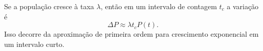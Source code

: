 Se a população cresce à taxa $\lambda$, então em um intervalo de contagem $t_c$ a variação é
\[
\Delta P \approx \lambda t_c P(t).
\]
Isso decorre da aproximação de primeira ordem para crescimento exponencial em um intervalo curto. 